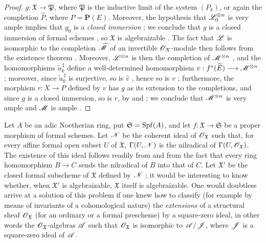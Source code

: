 \begin{proof}
$g:\mathfrak{X}\to\mathfrak{P}$, where $\mathfrak{P}$ is the inductive limit of
the system $(P_k)$, or again the completion $\widehat{P}$, where
$P=\mathbf{P}(E)$.  Moreover, the hypothesis that $\mathscr{L}_0^{\otimes n}$ is very
ample implies that $g_0$ is a \emph{closed immersion} ; we
conclude that $g$ is a closed immersion of formal schemes ,
so $\mathfrak{X}$ is algebraizable .  The fact that
$\mathscr{L}$ is isomorphic to the completion $\widehat{\mathscr{M}}$ of an invertible
$\mathscr{O}_X$-module then follows from the existence theorem .
Moreover, $\mathscr{L}^{\otimes n}$ is then the completion of
$\mathscr{M}^{\otimes n}$ , and the homomorphisms
$\widetilde{u}_k^{\,\sharp}$ define a well-determined homomorphism
$v:f^*(\widetilde{E})\longrightarrow\mathscr{M}^{\otimes n}$
; moreover, since $\widetilde{u}_0^{\,\sharp}$ is surjective,
so is $\widehat{v}$ , hence so is $v$ ;
furthermore, the morphism $r:X\to P$ defined by $v$  has
$g$ as its extension to the completions, and since $g$ is a closed immersion,
so is $r$, by  and ; we conclude that
$\mathscr{M}^{\otimes n}$ is very ample  and $\mathscr{M}$ is ample
.
\end{proof}

\begin{remark}[5.4.6]
\label{III.5.4.6}
Let $A$ be an adic Noetherian ring, put
$\mathfrak{S}=\operatorname{Spf}(A)$, and let
$f:\mathfrak{X}\to\mathfrak{S}$ be a proper morphism of formal
schemes.  Let $\mathscr{N}$ be the coherent ideal of
$\mathscr{O}_{\mathfrak{X}}$ such that, for every affine formal open
subset $U$ of $\mathfrak{X}$, $\Gamma(U,\mathscr{N})$
is the nilradical of
$\Gamma(U,\mathscr{O}_{\mathfrak{X}})$.  The existence of this ideal
follows readily from  and from the fact that
every ring homomorphism $B\to C$ sends the nilradical of $B$ into
that of $C$.  Let $\mathfrak{X}'$ be the closed formal
subscheme of $\mathfrak{X}$ defined by $\mathscr{N}$
; it would be interesting to know whether,
when $\mathfrak{X}'$ is algebraizable, $\mathfrak{X}$ itself is
algebraizable.  One would doubtless arrive at a solution of this
problem if one knew how to classify (for example by means of invariants
of a cohomological nature) the \emph{extensions} of a structural
sheaf $\mathscr{O}_{\mathfrak{X}}$ (for an ordinary or a formal
prescheme) by a square-zero ideal, in other words the
$\mathscr{O}_{\mathfrak{X}}$-algebras $\mathscr{A}$ such that
$\mathscr{O}_{\mathfrak{X}}$ is isomorphic to $\mathscr{A}/\mathscr{J}$, where $\mathscr{J}$ is a
square-zero ideal of $\mathscr{A}$.
\end{remark}


